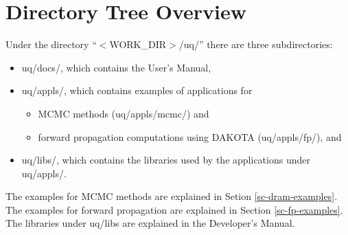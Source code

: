 \section{Directory Tree Overview}

Under the directory ``$<$WORK\_DIR$>$/uq/'' there are three subdirectories:
\begin{itemize}
\item uq/docs/, which contains the User's Manual,
\item {uq/appls/, which contains examples of applications for
\begin{itemize}
\item MCMC methods (uq/appls/mcmc/) and
\item forward propagation computations using DAKOTA (uq/appls/fp/), and
\end{itemize}
}
\item uq/libs/, which contains the libraries used by the applications under uq/appls/.
\end{itemize}

The examples for MCMC methods are explained in Setion \ref{sc-dram-examples}.
The examples for forward propagation are explained in Section \ref{sc-fp-examples}.
The libraries under uq/libs are explained in the Developer's Manual.

